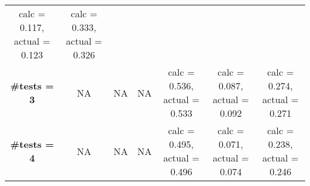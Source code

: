 \documentclass[
]{article}
\begin{document}
\begin{longtable}[]{@{}ccccccc@{}}
\begin{minipage}[t]{0.16\columnwidth}
calc = 0.117, actual = 0.123\strut
\end{minipage} & \begin{minipage}[t]{0.16\columnwidth}\centering
calc = 0.333, actual = 0.326\strut
\end{minipage}\tabularnewline
\begin{minipage}[t]{0.09\columnwidth}\centering
\textbf{\#tests = 3}\strut
\end{minipage} & \begin{minipage}[t]{0.08\columnwidth}\centering
NA\strut
\end{minipage} & \begin{minipage}[t]{0.08\columnwidth}\centering
NA\strut
\end{minipage} & \begin{minipage}[t]{0.08\columnwidth}\centering
NA\strut
\end{minipage} & \begin{minipage}[t]{0.16\columnwidth}\centering
calc = 0.536, actual = 0.533\strut
\end{minipage} & \begin{minipage}[t]{0.16\columnwidth}\centering
calc = 0.087, actual = 0.092\strut
\end{minipage} & \begin{minipage}[t]{0.16\columnwidth}\centering
calc = 0.274, actual = 0.271\strut
\end{minipage}\tabularnewline
\begin{minipage}[t]{0.09\columnwidth}\centering
\textbf{\#tests = 4}\strut
\end{minipage} & \begin{minipage}[t]{0.08\columnwidth}\centering
NA\strut
\end{minipage} & \begin{minipage}[t]{0.08\columnwidth}\centering
NA\strut
\end{minipage} & \begin{minipage}[t]{0.08\columnwidth}\centering
NA\strut
\end{minipage} & \begin{minipage}[t]{0.16\columnwidth}\centering
calc = 0.495, actual = 0.496\strut
\end{minipage} & \begin{minipage}[t]{0.16\columnwidth}\centering
calc = 0.071, actual = 0.074\strut
\end{minipage} & \begin{minipage}[t]{0.16\columnwidth}\centering
calc = 0.238, actual = 0.246\strut
\end{minipage}\tabularnewline

\end{longtable}
\end{document}
